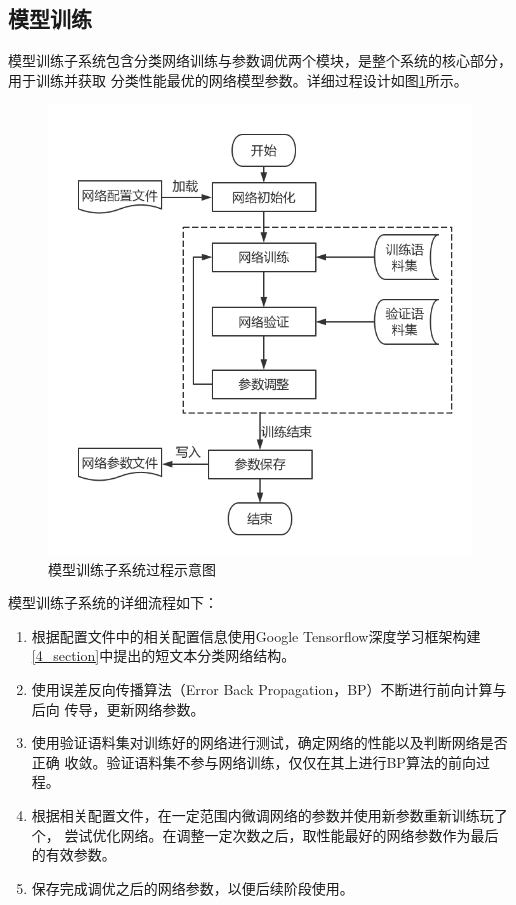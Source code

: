 \subsection{模型训练}
模型训练子系统包含分类网络训练与参数调优两个模块，是整个系统的核心部分，用于训练并获取
分类性能最优的网络模型参数。详细过程设计如图\ref{train}所示。
\begin{figure}[!hbp]
    \includegraphics[scale=0.6]{picture/train.png}
    \caption{模型训练子系统过程示意图}
    \label{train}
\end{figure}

模型训练子系统的详细流程如下：
\begin{enumerate}
    \item 根据配置文件中的相关配置信息使用Google Tensorflow深度学习框架构建
    \ref{4_section}中提出的短文本分类网络结构。
    \item 使用误差反向传播算法（Error Back Propagation，BP）不断进行前向计算与后向
    传导，更新网络参数。
    \item 使用验证语料集对训练好的网络进行测试，确定网络的性能以及判断网络是否正确
    收敛。验证语料集不参与网络训练，仅仅在其上进行BP算法的前向过程。
    \item 根据相关配置文件，在一定范围内微调网络的参数并使用新参数重新训练玩了个，
    尝试优化网络。在调整一定次数之后，取性能最好的网络参数作为最后的有效参数。
    \item 保存完成调优之后的网络参数，以便后续阶段使用。
    \end{enumerate}

